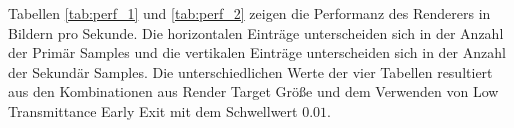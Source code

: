 Tabellen \ref{tab:perf_1} und \ref{tab:perf_2} zeigen die Performanz des Renderers in Bildern pro Sekunde. Die horizontalen Einträge unterscheiden sich in der Anzahl der Primär Samples und die vertikalen Einträge unterscheiden sich in der Anzahl der Sekundär Samples. Die unterschiedlichen Werte der vier Tabellen resultiert aus den Kombinationen aus Render Target Größe und dem Verwenden von Low Transmittance Early Exit mit dem Schwellwert $ 0.01 $.

\begin{table}[H]
\centering
\resizebox{\columnwidth}{!}{%
    \begin{tabular}{|c|c|c|c|c|}
          \hline
        - & 16 & 32 & 48 & 64\\
        \hline
        1 & 47 & 29 & 21 & 10\\
        \hline
        2 & 43 & 26 & 19 & 10\\
        \hline
        3 & 41 & 23 & 14 & 6\\
        \hline
        4 & 39 & 23 & 13 & 6\\
        \hline
    \end{tabular}
    
    \begin{tabular}{|c|c|c|c|c|}
        \hline
        - & 16 & 32 & 48 & 64\\
        \hline
        1 & 43 & 26 & 19 & 8\\
        \hline
        2 & 39 & 23 & 18 & 8\\
        \hline
        3 & 37 & 21 & 13 & 6\\
        \hline
        4 & 34 & 21 & 12 & 6\\
        \hline
    \end{tabular}}
\caption{1920 x 1017 - Mit und ohne Early Exit}
\label{tab:perf_1}
\end{table}

